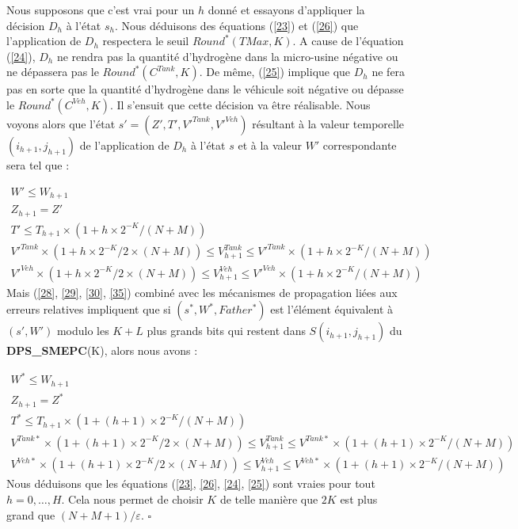 Nous supposons que c'est vrai pour un $h$ donné et essayons d'appliquer la décision $D_h$ à l'état $s_h$. Nous déduisons des équations (\ref{23}) et (\ref{26}) que l'application de $D_h$ respectera le seuil $Round^*(TMax, K)$. A cause de l'équation (\ref{24}), $D_h$ ne rendra pas la quantité d'hydrogène dans la micro-usine négative ou ne dépassera pas le $Round^*(C^{Tank}, K)$. De même, (\ref{25}) implique que $D_h$ ne fera pas en sorte que la quantité d'hydrogène dans le véhicule soit négative ou dépasse le $Round^*(C^{Veh}, K)$. Il s'ensuit que cette décision va être réalisable. Nous voyons alors que l'état $s' = (Z', T', V'^{Tank}, V'^{Veh})$ résultant à la valeur temporelle $(i_{h+1}, j_{h+1})$ de l'application de $D_h$ à l'état $s$ et à la valeur $W'$ correspondante sera tel que :		

\begin{subequations}
	\begin{align}
	\label{27}	W' \leq W_{h+1}&  & \\ 
	\label{28}	Z_{h+1}=Z'&  & \\
	\label{29}	T'\leq T_{h+1} \times (1+h\times 2^{-K}/(N+M))&  & \\
	\label{30}	V'^{Tank}\times (1+h\times 2^{-K}/2\times (N+M)) \leq V^{Tank}_{h+1} \leq V'^{Tank} \times (1+h\times 2^{-K}/(N+M))&  &\\
	\label{35}	V'^{Veh} \times (1+h\times 2^{-K}/2\times (N+M)) \leq V^{Veh}_{h+1}  \leq V'^{Veh}\times (1+h\times 2^{-K}/(N+M))&  & 
	\end{align}
\end{subequations}
Mais (\ref{28}, \ref{29}, \ref{30}, \ref{35}) combiné avec les mécanismes de propagation liées aux erreurs relatives impliquent que si $(s^*, W^*, Father^*)$ est l'élément équivalent à $(s', W')$ modulo les $K + L$ plus grands bits qui restent dans $S(i_{h + 1}, j_{h + 1})$ du \textbf{DPS\_SMEPC}(K), alors nous avons : 	

\begin{subequations}
	\begin{align}
	\label{31}	W^* \leq W_{h+1}&  & \\ 
	\label{32}	Z_{h+1}=Z^*&  & \\
	\label{33}	T^*\leq T_{h+1} \times (1+(h+1)\times 2^{-K}/(N+M))&  & \\
	\label{34}V^{Tank*}\times (1+(h+1)\times 2^{-K}/2\times (N+M)) \leq V^{Tank}_{h+1} \leq V^{Tank*} \times (1+(h+1)\times 2^{-K}/(N+M))&  &\\
	\label{36}V^{Veh*} \times (1+(h+1)\times 2^{-K}/2\times (N+M)) \leq V^{Veh}_{h+1}  \leq V^{Veh*}\times (1+(h+1)\times 2^{-K}/(N+M))&  & 
	\end{align}
\end{subequations}%
Nous déduisons que les équations (\ref{23}, \ref{26}, \ref{24}, \ref{25}) sont vraies pour tout $h=0, \dots, H$. Cela nous permet de choisir $K$ de telle manière que $2K$ est plus grand que $(N + M + 1) / \varepsilon$.  $\square$

